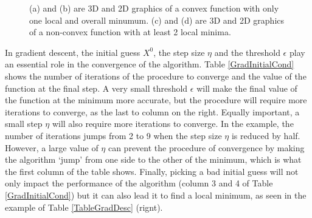 \documentclass{article}
\begin{document}
\begin{figure}[htb]
\begin{center}
{    
  }
\caption{(a) and (b) are 3D and 2D graphics of a convex function with only one local and overall minumum. (c) and (d) are 3D and 2D graphics of a non-convex function with at least 2 local minima.}
\label{3D2Dgraphs}
\end{center}
\end{figure}

In gradient descent, the initial guess $X^0$, the step size $\eta$ and the threshold $\epsilon$ play an essential role in the convergence of the algorithm. Table \ref{GradInitialCond} shows the number of iterations of the procedure to converge and the value of the function at the final step. A very small threshold $\epsilon$ will make the final value of the function at the minimum more accurate, but the procedure will require more iterations to converge, as the last to column on the right. Equally important, a small step $\eta$ will also require more iterations to converge. In the example, the number of iterations jumps from 2 to 9 when the step size $\eta$ is reduced by half. However, a large value of $\eta$ can prevent the procedure of convergence by making the algorithm `jump' from one side to the other of the minimum, which is what the first column of the table shows. Finally, picking a bad initial guess will not only impact the performance of the algorithm (column 3 and 4 of Table \ref{GradInitialCond}) but it can also lead it to find a local minimum, as seen in the example of Table \ref{TableGradDesc} (rignt). 
\end{document}
